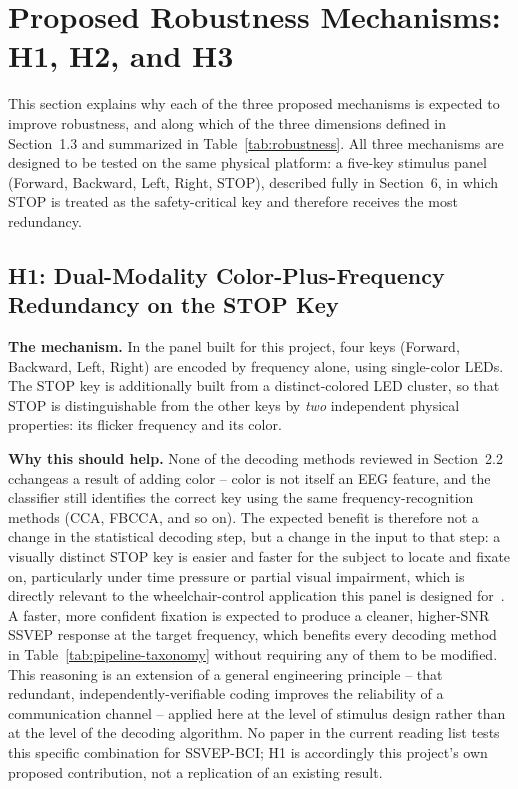 \documentclass[11pt]{article}
\begin{document}
\section{Proposed Robustness Mechanisms: H1, H2, and H3}

This section explains why each of the three proposed mechanisms is expected to improve robustness, and along which of the three dimensions defined in Section~1.3 and summarized in Table~\ref{tab:robustness}. All three mechanisms are designed to be tested on the same physical platform: a five-key stimulus panel (Forward, Backward, Left, Right, STOP), described fully in Section~6, in which STOP is treated as the safety-critical key and therefore receives the most redundancy.

\subsection{H1: Dual-Modality Color-Plus-Frequency Redundancy on the STOP Key}

\textbf{The mechanism.} In the panel built for this project, four keys (Forward, Backward, Left, Right) are encoded by frequency alone, using single-color LEDs. The STOP key is additionally built from a distinct-colored LED cluster, so that STOP is distinguishable from the other keys by \emph{two} independent physical properties: its flicker frequency and its color.

\textbf{Why this should help.} None of the decoding methods reviewed in Section~2.2 cchangeas a result of adding color -- color is not itself an EEG feature, and the classifier still identifies the correct key using the same frequency-recognition methods (CCA, FBCCA, and so on). The expected benefit is therefore not a change in the statistical decoding step, but a change in the input to that step: a visually distinct STOP key is easier and faster for the subject to locate and fixate on, particularly under time pressure or partial visual impairment, which is directly relevant to the wheelchair-control application this panel is designed for~\cite{nicolasalonso2012bci}. A faster, more confident fixation is expected to produce a cleaner, higher-SNR SSVEP response at the target frequency, which benefits every decoding method in Table~\ref{tab:pipeline-taxonomy} without requiring any of them to be modified. This reasoning is an extension of a general engineering principle -- that redundant, independently-verifiable coding improves the reliability of a communication channel -- applied here at the level of stimulus design rather than at the level of the decoding algorithm. No paper in the current reading list tests this specific combination for SSVEP-BCI; H1 is accordingly this project's own proposed contribution, not a replication of an existing result.
\end{document}
